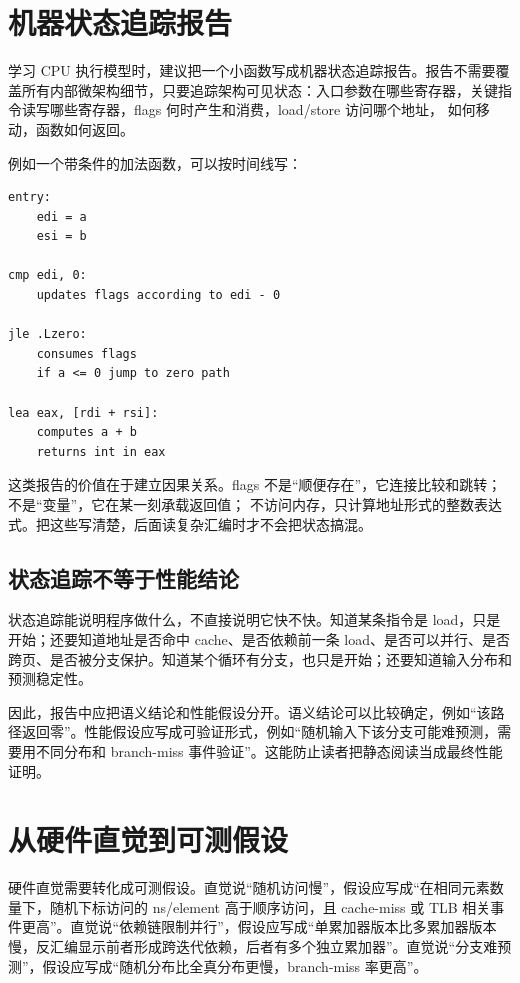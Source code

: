 \section{机器状态追踪报告}

学习 CPU 执行模型时，建议把一个小函数写成机器状态追踪报告。报告不需要覆盖所有内部微架构细节，只要追踪架构可见状态：入口参数在哪些寄存器，关键指令读写哪些寄存器，flags 何时产生和消费，load/store 访问哪个地址， 如何移动，函数如何返回。

例如一个带条件的加法函数，可以按时间线写：

\begin{lstlisting}
entry:
    edi = a
    esi = b

cmp edi, 0:
    updates flags according to edi - 0

jle .Lzero:
    consumes flags
    if a <= 0 jump to zero path

lea eax, [rdi + rsi]:
    computes a + b
    returns int in eax
\end{lstlisting}

这类报告的价值在于建立因果关系。flags 不是“顺便存在”，它连接比较和跳转； 不是“变量”，它在某一刻承载返回值； 不访问内存，只计算地址形式的整数表达式。把这些写清楚，后面读复杂汇编时才不会把状态搞混。

\subsection{状态追踪不等于性能结论}

状态追踪能说明程序做什么，不直接说明它快不快。知道某条指令是 load，只是开始；还要知道地址是否命中 cache、是否依赖前一条 load、是否可以并行、是否跨页、是否被分支保护。知道某个循环有分支，也只是开始；还要知道输入分布和预测稳定性。

因此，报告中应把语义结论和性能假设分开。语义结论可以比较确定，例如“该路径返回零”。性能假设应写成可验证形式，例如“随机输入下该分支可能难预测，需要用不同分布和 branch-miss 事件验证”。这能防止读者把静态阅读当成最终性能证明。

\section{从硬件直觉到可测假设}

硬件直觉需要转化成可测假设。直觉说“随机访问慢”，假设应写成“在相同元素数量下，随机下标访问的 ns/element 高于顺序访问，且 cache-miss 或 TLB 相关事件更高”。直觉说“依赖链限制并行”，假设应写成“单累加器版本比多累加器版本慢，反汇编显示前者形成跨迭代依赖，后者有多个独立累加器”。直觉说“分支难预测”，假设应写成“随机分布比全真分布更慢，branch-miss 率更高”。

